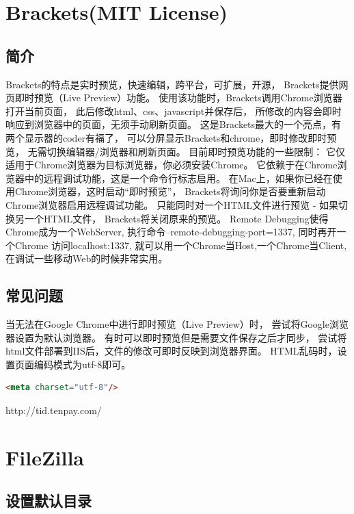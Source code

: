 \documentclass{book}
\begin{document}
\section{Brackets(MIT License)}

\subsection{简介}

Brackets的特点是实时预览，快速编辑，跨平台，可扩展，开源，
Brackets提供网页即时预览（Live Preview）功能。
使用该功能时，Brackets调用Chrome浏览器打开当前页面，
此后修改html、css、javascript并保存后，
所修改的内容会即时响应到浏览器中的页面，无须手动刷新页面。
这是Brackets最大的一个亮点，有两个显示器的coder有福了，
可以分屏显示Brackets和chrome，即时修改即时预览，
无需切换编辑器/浏览器和刷新页面。
目前即时预览功能的一些限制：
它仅适用于Chrome浏览器为目标浏览器，你必须安装Chrome。
它依赖于在Chrome浏览器中的远程调试功能，这是一个命令行标志启用。
在Mac上，如果你已经在使用Chrome浏览器，这时启动“即时预览”，
Brackets将询问你是否要重新启动Chrome浏览器启用远程调试功能。
只能同时对一个HTML文件进行预览 - 如果切换另一个HTML文件，
Brackets将关闭原来的预览。
Remote Debugging使得Chrome成为一个WebServer,
执行命令--remote-debugging-port=1337, 
同时再开一个Chrome 访问localhost:1337, 
就可以用一个Chrome当Host,一个Chrome当Client,
在调试一些移动Web的时候非常实用。

\subsection{常见问题}

当无法在Google Chrome中进行即时预览（Live Preview）时，
尝试将Google浏览器设置为默认浏览器。
有时可以即时预览但是需要文件保存之后才同步，
尝试将html文件部署到IIS后，文件的修改可即时反映到浏览器界面。
HTML乱码时，设置页面编码模式为utf-8即可。

\begin{lstlisting}[language=HTML]
<meta charset="utf-8"/>
\end{lstlisting}

http://tid.tenpay.com/

\section{FileZilla}

\subsection{设置默认目录}
\end{document}
